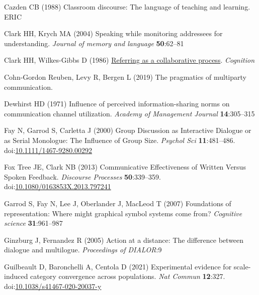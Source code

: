 \documentclass[
  english,
]{article}
\newlength{\cslhangindent}
\newlength{\cslentryspacingunit} %
\newenvironment{CSLReferences}[2] %
 {%
  \setlength{\parindent}{0pt}
  \ifodd #1
  \let\oldpar\par
  \def\par{\hangindent=\cslhangindent\oldpar}
  \fi
  \setlength{\parskip}{#2\cslentryspacingunit}
 }%
 {}
\begin{document}
\begin{CSLReferences}{1}{0}
\leavevmode{}%
Cazden CB (1988) Classroom discourse: The language of teaching and learning. ERIC

\leavevmode{}%
Clark HH, Krych MA (2004) Speaking while monitoring addressees for understanding. \emph{Journal of memory and language} \textbf{50}:62--81

\leavevmode{}%
Clark HH, Wilkes-Gibbs D (1986) \href{http://www.speech.kth.se/~edlund/bielefeld/references/clark-and-wilkes-gibbs-1986.pdf}{Referring as a collaborative process}. \emph{Cognition}

\leavevmode{}%
Cohn-Gordon Reuben, Levy R, Bergen L (2019) The pragmatics of multiparty communication.

\leavevmode{}%
Dewhirst HD (1971) Influence of perceived information-sharing norms on communication channel utilization. \emph{Academy of Management Journal} \textbf{14}:305--315

\leavevmode{}%
Fay N, Garrod S, Carletta J (2000) Group {Discussion} as {Interactive Dialogue} or as {Serial Monologue}: {The Influence} of {Group Size}. \emph{Psychol Sci} \textbf{11}:481--486. doi:\href{https://doi.org/10.1111/1467-9280.00292}{10.1111/1467-9280.00292}

\leavevmode{}%
Fox Tree JE, Clark NB (2013) Communicative {Effectiveness} of {Written Versus Spoken Feedback}. \emph{Discourse Processes} \textbf{50}:339--359. doi:\href{https://doi.org/10.1080/0163853X.2013.797241}{10.1080/0163853X.2013.797241}

\leavevmode{}%
Garrod S, Fay N, Lee J, Oberlander J, MacLeod T (2007) Foundations of representation: Where might graphical symbol systems come from? \emph{Cognitive science} \textbf{31}:961--987

\leavevmode{}%
Ginzburg J, Fernandez R (2005) Action at a distance: The difference between dialogue and multilogue. \emph{Proceedings of DIALOR}:9

\leavevmode{}%
Guilbeault D, Baronchelli A, Centola D (2021) Experimental evidence for scale-induced category convergence across populations. \emph{Nat Commun} \textbf{12}:327. doi:\href{https://doi.org/10.1038/s41467-020-20037-y}{10.1038/s41467-020-20037-y}


\end{CSLReferences}
\end{document}

